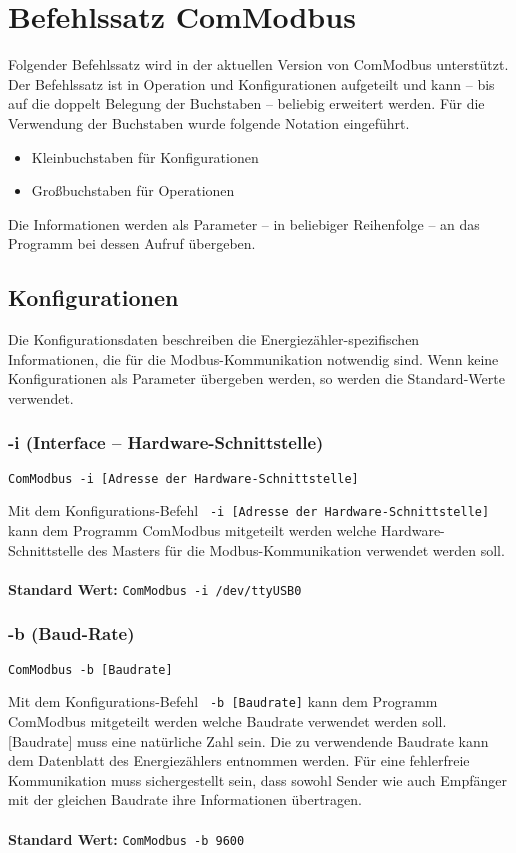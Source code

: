 \documentclass[Bachelorarbeit.tex]{subfiles}
\begin{document}
\chapter{Befehlssatz ComModbus}
\label{chap:befehlssatz_comModbus}
Folgender Befehlssatz wird in der aktuellen Version von ComModbus unterstützt. Der Befehlssatz ist in Operation und Konfigurationen aufgeteilt und kann – bis auf die doppelt Belegung der Buchstaben – beliebig erweitert werden. 
Für die Verwendung der Buchstaben wurde folgende Notation eingeführt. 

\begin{itemize}
\item Kleinbuchstaben für Konfigurationen
\item Großbuchstaben für Operationen 
\end{itemize}

Die Informationen werden als Parameter – in beliebiger Reihenfolge –  an das Programm bei dessen Aufruf übergeben.

\section{Konfigurationen}
\label{sec:befehl_konfiguration}
Die Konfigurationsdaten beschreiben die Energiezähler-spezifischen Informationen, die für die Modbus-Kommunikation notwendig sind. Wenn keine Konfigurationen als Parameter übergeben werden, so werden die Standard-Werte verwendet.

\subsection*{-i (Interface – Hardware-Schnittstelle)}

\begin{verbatim}
ComModbus -i [Adresse der Hardware-Schnittstelle]
\end{verbatim}
Mit dem Konfigurations-Befehl \texttt{ -i [Adresse der Hardware-Schnittstelle]} kann dem Programm ComModbus mitgeteilt werden welche Hardware-Schnittstelle des Masters für die Modbus-Kommunikation verwendet werden soll.\\
\\
\textbf{Standard Wert:} \tab \texttt{ComModbus -i /dev/ttyUSB0}

\subsection*{-b (Baud-Rate)}
\begin{verbatim}
ComModbus -b [Baudrate]
\end{verbatim}
Mit dem Konfigurations-Befehl \texttt{ -b [Baudrate]} kann dem Programm ComModbus mitgeteilt werden welche Baudrate verwendet werden soll. [Baudrate] muss eine natürliche Zahl sein. Die zu verwendende Baudrate kann dem Datenblatt des Energiezählers entnommen werden. Für eine fehlerfreie Kommunikation muss sichergestellt sein, dass sowohl Sender wie auch Empfänger mit der gleichen Baudrate ihre Informationen übertragen.\\
\\
\textbf{Standard Wert:} \tab \texttt{ComModbus -b 9600}
\end{document}
